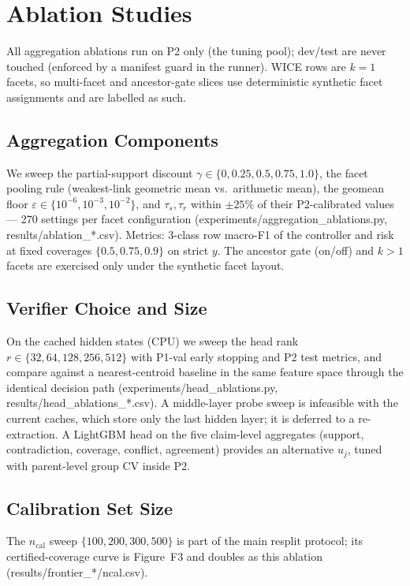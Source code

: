 \documentclass{article}
\begin{document}
\section{Ablation Studies}
\label{sec:ablation}

All aggregation ablations run on P2 only (the tuning pool); dev/test are
never touched (enforced by a manifest guard in the runner). WICE rows
are $k{=}1$ facets, so multi-facet and ancestor-gate slices use
deterministic synthetic facet assignments and are labelled as such.

\subsection{Aggregation Components}
We sweep the partial-support discount
$\gamma\in\{0,0.25,0.5,0.75,1.0\}$, the facet pooling rule
(weakest-link geometric mean vs.\ arithmetic mean), the geomean floor
$\varepsilon\in\{10^{-6},10^{-3},10^{-2}\}$, and $\tau_s,\tau_r$ within
$\pm25\%$ of their P2-calibrated values --- 270 settings per facet
configuration (experiments/aggregation\_ablations.py,
results/ablation\_*.csv). Metrics: 3-class row macro-F1 of the
controller and risk at fixed coverages $\{0.5,0.75,0.9\}$ on strict $y$.
The ancestor gate (on/off) and $k{>}1$ facets are exercised only under
the synthetic facet layout.

\subsection{Verifier Choice and Size}
On the cached hidden states (CPU) we sweep the head rank
$r\in\{32,64,128,256,512\}$ with P1-val early stopping and P2 test
metrics, and compare against a nearest-centroid baseline in the same
feature space through the identical decision path
(experiments/head\_ablations.py, results/head\_ablations\_*.csv). A
middle-layer probe sweep is infeasible with the current caches, which
store only the last hidden layer; it is deferred to a re-extraction.
A LightGBM head on the five claim-level aggregates
(support, contradiction, coverage, conflict, agreement) provides an
alternative $u_j$, tuned with parent-level group CV inside P2.

\subsection{Calibration Set Size}
The $n_{\mathrm{cal}}$ sweep $\{100,200,300,500\}$ is part of the main
resplit protocol; its certified-coverage curve is Figure~F3 and
doubles as this ablation (results/frontier\_*/ncal.csv).
\end{document}
